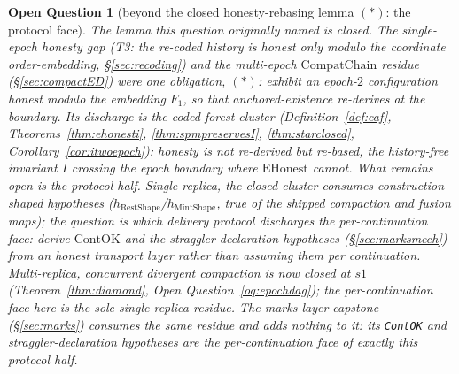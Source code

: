 \documentclass[11pt]{article}
\newtheorem{openq}[theorem]{Open Question}
\newcommand{\lean}[1]{\texttt{#1}}
\begin{document}
\begin{openq}[beyond the closed honesty-rebasing lemma $(\ast)$: the
protocol face]
\label{oq:starlemma}
The lemma this question originally named is closed. The single-epoch
honesty gap (T3: the re-coded history is honest only \emph{modulo} the
coordinate order-embedding, \S\ref{sec:recoding}) and the multi-epoch
$\mathrm{CompatChain}$ residue (\S\ref{sec:compactED}) were one
obligation, $(\ast)$: exhibit an epoch-$2$ configuration honest modulo
the embedding $F_1$, so that anchored-existence re-derives at the
boundary. Its discharge is the coded-forest cluster
(Definition~\ref{def:caf}, Theorems~\ref{thm:ehonesti},
\ref{thm:spmpreservesI}, \ref{thm:starclosed},
Corollary~\ref{cor:itwoepoch}): honesty is not re-derived but
\emph{re-based}, the history-free invariant $I$ crossing the epoch
boundary where $\mathrm{EHonest}$ cannot. What remains open is the
protocol half. Single replica, the closed cluster consumes
construction-shaped hypotheses
($h_{\mathrm{RestShape}}$/$h_{\mathrm{MintShape}}$, true of the
shipped compaction and fusion maps); the question is which
\emph{delivery protocol} discharges the per-continuation face: derive
$\mathrm{ContOK}$ and the straggler-declaration hypotheses
(\S\ref{sec:marksmech}) from an honest transport layer rather than
assuming them per continuation. Multi-replica, concurrent divergent
compaction is now closed at $s1$ (Theorem~\ref{thm:diamond},
Open Question~\ref{oq:epochdag}); the per-continuation face here is the
sole single-replica residue. The marks-layer capstone
(\S\ref{sec:marks}) consumes the same residue and adds nothing to it:
its \lean{ContOK} and straggler-declaration hypotheses are the
per-continuation face of exactly this protocol half.
\end{openq}
\end{document}
